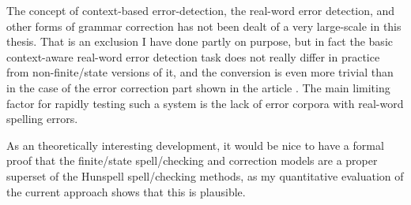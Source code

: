 \documentclass[officiallayout]{unihelcompling}
\begin{document}
The concept of context-based error-detection, the real-word error detection,
and other forms of grammar correction has not been dealt of a very large-scale
in this thesis. That is an exclusion I have done partly on purpose, but in fact
the basic context-aware real-word error detection task does not really differ
in practice from non-finite\-/state versions of it, and the conversion is even
more trivial than in the case of the error correction part shown in the article
. The main limiting factor for rapidly testing
such a system is the lack of error corpora with real-word spelling errors.

As an theoretically interesting development, it would be nice to have a formal
proof that the finite\-/state spell\-/checking and correction models are a proper
superset of the Hunspell spell\-/checking methods, as my quantitative
evaluation of the current approach shows that this is plausible.





\end{document}
